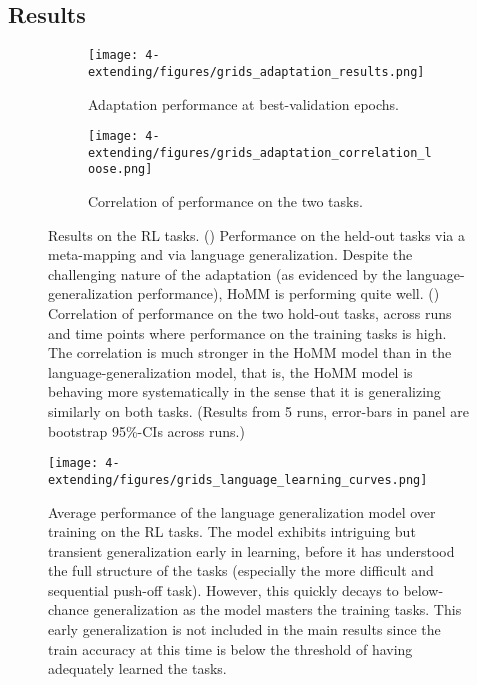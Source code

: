 \subsection{Results}

\begin{figure}
\centering
\begin{subfigure}{0.5\textwidth}
\texttt{[image: 4-extending/figures/grids\_adaptation\_results.png]}
\caption{Adaptation performance at best-validation epochs.}\label{fig:HoMM_RL_results:accuracy}
\end{subfigure}%
\begin{subfigure}{0.5\textwidth}
\texttt{[image: 4-extending/figures/grids\_adaptation\_correlation\_loose.png]}
\caption{Correlation of performance on the two tasks.}\label{fig:HoMM_RL_results:correlation}
\end{subfigure}%

\caption[Results on the RL tasks.]{Results on the RL tasks. () Performance on the held-out tasks via a meta-mapping and via language generalization. Despite the challenging nature of the adaptation (as evidenced by the language-generalization performance), HoMM is performing quite well. () Correlation of performance on the two hold-out tasks, across runs and time points where performance on the training tasks is high. The correlation is much stronger in the HoMM model than in the language-generalization model, that is, the HoMM model is behaving more systematically in the sense that it is generalizing similarly on both tasks. (Results from 5 runs, error-bars in panel  are bootstrap 95\%-CIs across runs.)} \label{fig:HoMM_RL_results}
\end{figure}

\begin{figure}
\centering
\texttt{[image: 4-extending/figures/grids\_language\_learning\_curves.png]}
\caption[Language generalization model learning curves on the RL tasks.]{Average performance of the language generalization model over training on the RL tasks. The model exhibits intriguing but transient generalization early in learning, before it has understood the full structure of the tasks (especially the more difficult and sequential push-off task). However, this quickly decays to below-chance generalization as the model masters the training tasks. This early generalization is not included in the main results since the train accuracy at this time is below the threshold of having adequately learned the tasks.} \label{fig:HoMM_RL_language_learning_curves}
\end{figure}

